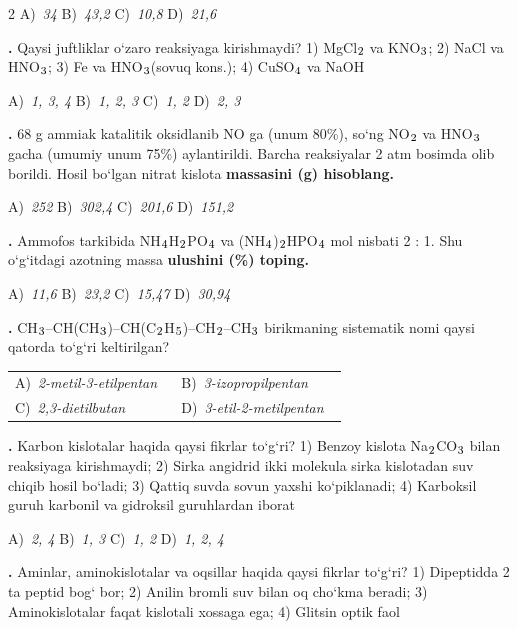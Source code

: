 \documentclass[11pt,a4paper]{article}
\renewcommand{\textsubscript}[1]{\ensuremath{_{\text{\fontsize{8}{8}\selectfont #1}}}}
\newcommand{\qn}[1]{\textbf{\fontsize{11.5}{13}\selectfont #1}}
\newcommand{\qsep}{\par\vspace{13pt}}
\begin{document}
\begin{multicols}{2}
\noindent A)~\textsl{34} \hfill B)~\textsl{43,2} \hfill C)~\textsl{10,8} \hfill D)~\textsl{21,6}\par
\qsep
\noindent\qn{17.} Qaysi juftliklar o`zaro reaksiyaga kirishmaydi? 1) MgCl\textsubscript{2} va KNO\textsubscript{3}; 2) NaCl va HNO\textsubscript{3}; 3) Fe va HNO\textsubscript{3}(sovuq kons.); 4) CuSO\textsubscript{4} va NaOH

\noindent A)~\textsl{1, 3, 4} \hfill B)~\textsl{1, 2, 3} \hfill C)~\textsl{1, 2} \hfill D)~\textsl{2, 3}\par
\qsep
\noindent\qn{18.} 68 g ammiak katalitik oksidlanib NO ga (unum 80\%), so`ng NO\textsubscript{2} va HNO\textsubscript{3} gacha (umumiy unum 75\%) aylantirildi. Barcha reaksiyalar 2 atm bosimda olib borildi. Hosil bo`lgan nitrat kislota \textbf{massasini (g) hisoblang.}

\noindent A)~\textsl{252} \hfill B)~\textsl{302,4} \hfill C)~\textsl{201,6} \hfill D)~\textsl{151,2}\par
\qsep
\noindent\qn{19.} Ammofos tarkibida NH\textsubscript{4}H\textsubscript{2}PO\textsubscript{4} va (NH\textsubscript{4})\textsubscript{2}HPO\textsubscript{4} mol nisbati 2 : 1. Shu o`g`itdagi azotning massa \textbf{ulushini (\%) toping.}

\noindent A)~\textsl{11,6} \hfill B)~\textsl{23,2} \hfill C)~\textsl{15,47} \hfill D)~\textsl{30,94}\par
\qsep
\noindent\qn{20.} CH\textsubscript{3}--CH(CH\textsubscript{3})--CH(C\textsubscript{2}H\textsubscript{5})--CH\textsubscript{2}--CH\textsubscript{3} birikmaning sistematik nomi qaysi qatorda to`g`ri keltirilgan?

\noindent\begin{tabular}{@{}p{0.47\linewidth}@{}p{0.47\linewidth}@{}}
A)~\textsl{2-metil-3-etilpentan} & B)~\textsl{3-izopropilpentan} \\
C)~\textsl{2,3-dietilbutan} & D)~\textsl{3-etil-2-metilpentan} \\
\end{tabular}\par
\qsep
\noindent\qn{21.} Karbon kislotalar haqida qaysi fikrlar to`g`ri? 1) Benzoy kislota Na\textsubscript{2}CO\textsubscript{3} bilan reaksiyaga kirishmaydi; 2) Sirka angidrid ikki molekula sirka kislotadan suv chiqib hosil bo`ladi; 3) Qattiq suvda sovun yaxshi ko`piklanadi; 4) Karboksil guruh karbonil va gidroksil guruhlardan iborat

\noindent A)~\textsl{2, 4} \hfill B)~\textsl{1, 3} \hfill C)~\textsl{1, 2} \hfill D)~\textsl{1, 2, 4}\par
\qsep
\noindent\qn{22.} Aminlar, aminokislotalar va oqsillar haqida qaysi fikrlar to`g`ri? 1) Dipeptidda 2 ta peptid bog` bor; 2) Anilin bromli suv bilan oq cho`kma beradi; 3) Aminokislotalar faqat kislotali xossaga ega; 4) Glitsin optik faol


\end{multicols}
\end{document}
